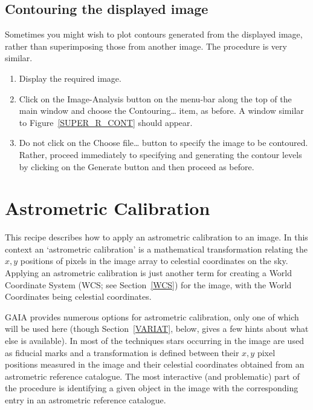 \documentclass[twoside,11pt]{starlink}
\begin{document}
\subsection{Contouring the displayed image}

Sometimes you might wish to plot contours generated from the displayed
image, rather than superimposing those from another image.  The procedure
is very similar.

\begin{enumerate}

  \item Display the required image.

  \item Click on the \textsf{Image-Analysis} button on the menu-bar along the
   top of the main window and choose the \textsf{Contouring\ldots} item, as
   before.  A window similar to Figure~\ref{SUPER_R_CONT} should appear.

  \item Do not click on the \textsf{Choose file\ldots} button to specify
   the image to be contoured.  Rather, proceed immediately to specifying
   and generating the contour levels by clicking on the \textsf{Generate}
   button and then proceed as before.

\end{enumerate}


\newpage
\section{\label{ASTROM_RECIP}Astrometric Calibration}

This recipe describes how to apply an astrometric calibration to an
image.  In this context an `astrometric calibration' is a mathematical
transformation relating the $x,y$\/ positions of pixels in the image
array to celestial coordinates on the sky.  Applying an astrometric
calibration is just another term for creating a World Coordinate System
(WCS; see Section~\ref{WCS}) for the image, with the World Coordinates
being celestial coordinates.

GAIA provides numerous options for astrometric calibration, only one of
which will be used here (though Section~\ref{VARIAT}, below, gives a few
hints about what else is available).  In most of the techniques stars
occurring in the image are used as fiducial marks and a transformation is
defined between their $x,y$\/ pixel positions measured in the image and
their celestial coordinates obtained from an astrometric reference
catalogue.  The most interactive (and problematic) part of the procedure
is identifying a given object in the image with the corresponding entry in
an astrometric reference catalogue.
\end{document}
